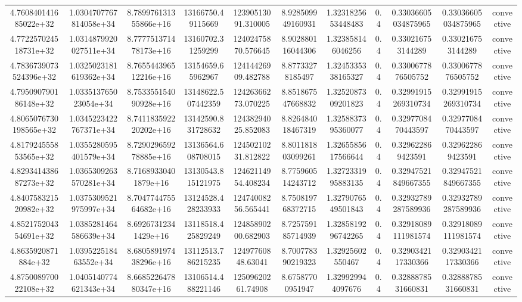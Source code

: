 \begin{table}
\begin{tabular}{ccccccccccc}
4.760840141685022e+32 & 1.0304707767814058e+34 & 8.789976131355866e+16 & 13166750.49115669 & 12390513091.310005 & 8.928509949160931 & 1.3231825653448483 & 0.4 & 0.33036605034875965 & 0.33036605034875965 & convective \\
4.772257024518731e+32 & 1.0314879920027511e+34 & 8.777751371478173e+16 & 13160702.31259299 & 12402475870.576645 & 8.902880116044306 & 1.323858146046256 & 0.4 & 0.330216753144289 & 0.330216753144289 & convective \\
4.7836739073524396e+32 & 1.0325023181619362e+34 & 8.765544396512216e+16 & 13154659.65962967 & 12414426909.482788 & 8.87733278185497 & 1.3245335338165327 & 0.4 & 0.3300677876505752 & 0.3300677876505752 & convective \\
4.795090790186148e+32 & 1.033513765023054e+34 & 8.753355154090928e+16 & 13148622.507442359 & 12426366273.070225 & 8.851867547668832 & 1.3252087309201823 & 0.4 & 0.32991915269310734 & 0.32991915269310734 & convective \\
4.8065076730198565e+32 & 1.0345223422767371e+34 & 8.741183592220202e+16 & 13142590.831728632 & 12438294025.852083 & 8.826484018467319 & 1.3258837395360077 & 0.4 & 0.3297708470443597 & 0.3297708470443597 & convective \\
4.817924555853565e+32 & 1.0355280595401579e+34 & 8.729029659278885e+16 & 13136564.608708015 & 12450210231.812822 & 8.801181803099261 & 1.3265585617566644 & 0.4 & 0.329622869423591 & 0.329622869423591 & convective \\
4.829341438687273e+32 & 1.0365309263570281e+34 & 8.71689330401879e+16 & 13130543.815121975 & 12462114954.408234 & 8.775960514243712 & 1.3272331995883135 & 0.4 & 0.32947521849667355 & 0.32947521849667355 & convective \\
4.840758321520982e+32 & 1.0375309521975997e+34 & 8.704774475564682e+16 & 13124528.428233933 & 12474008256.565441 & 8.750819768372715 & 1.3279076549501843 & 0.4 & 0.32932789287589936 & 0.32932789287589936 & convective \\
4.852175204354691e+32 & 1.0385281464586639e+34 & 8.69267312341429e+16 & 13118518.425829249 & 12485890200.682903 & 8.725759185714939 & 1.3285819296742265 & 0.4 & 0.32918089111981574 & 0.32918089111981574 & convective \\
4.8635920871884e+32 & 1.039522518463552e+34 & 8.680589197438296e+16 & 13112513.786215235 & 12497760848.63041 & 8.700778390219323 & 1.32925602550467 & 0.4 & 0.3290342117330366 & 0.3290342117330366 & convective \\
4.875008970022108e+32 & 1.0405140774621343e+34 & 8.668522647880347e+16 & 13106514.488221146 & 12509620261.74908 & 8.67587700951947 & 1.329929944097676 & 0.4 & 0.3288878531660831 & 0.3288878531660831 & convective \\

\end{tabular}
\end{table}
